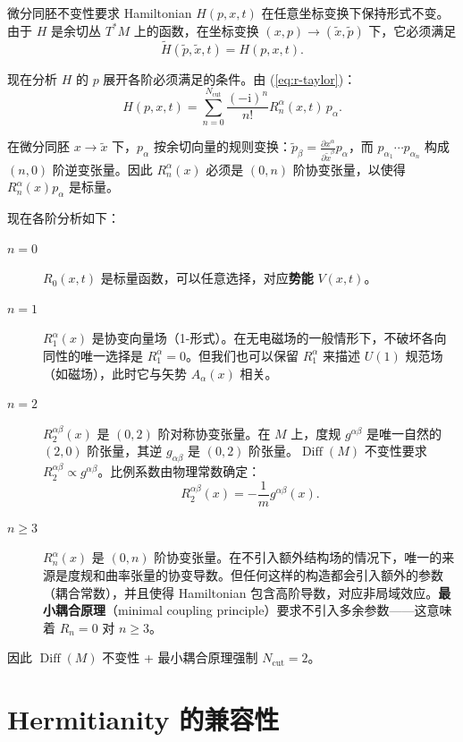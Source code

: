 \documentclass{book}
\newcommand{\mathi}{\mathrm{i}}
\begin{document}
微分同胚不变性要求 Hamiltonian $H(p,x,t)$ 在任意坐标变换下保持形式不变。由于 $H$ 是余切丛 $T^*M$ 上的函数，在坐标变换 $(x,p) \to (\tilde x, \tilde p)$ 下，它必须满足
\[
\tilde H(\tilde p, \tilde x, t) = H(p, x, t).
\]

现在分析 $H$ 的 $p$ 展开各阶必须满足的条件。由 (\ref{eq:r-taylor})：
\[
H(p,x,t) = \sum_{n=0}^{N_\text{cut}} \frac{(-\mathi)^n}{n!} R_n^\alpha(x,t) \, p_\alpha.
\]

在微分同胚 $x \to \tilde x$ 下，$p_\alpha$ 按余切向量的规则变换：$\tilde p_\beta = \frac{\partial x^\alpha}{\partial \tilde x^\beta} p_\alpha$，而 $p_{\alpha_1} \cdots p_{\alpha_n}$ 构成 $(n,0)$ 阶逆变张量。因此 $R_n^\alpha(x)$ 必须是 $(0,n)$ 阶协变张量，以使得 $R_n^\alpha(x) p_\alpha$ 是标量。

现在各阶分析如下：

\begin{description}
  \item[$n=0$] $R_0(x,t)$ 是标量函数，可以任意选择，对应\textbf{势能} $V(x,t)$。
  
  \item[$n=1$] $R_1^\alpha(x)$ 是协变向量场（1-形式）。在无电磁场的一般情形下，不破坏各向同性的唯一选择是 $R_1^\alpha = 0$。但我们也可以保留 $R_1^\alpha$ 来描述 $U(1)$ 规范场（如磁场），此时它与矢势 $A_\alpha(x)$ 相关。
  
  \item[$n=2$] $R_2^{\alpha\beta}(x)$ 是 $(0,2)$ 阶对称协变张量。在 $M$ 上，度规 $g^{\alpha\beta}$ 是唯一自然的 $(2,0)$ 阶张量，其逆 $g_{\alpha\beta}$ 是 $(0,2)$ 阶张量。$\operatorname{Diff}(M)$ 不变性要求 $R_2^{\alpha\beta} \propto g^{\alpha\beta}$。比例系数由物理常数确定：
    \[
    R_2^{\alpha\beta}(x) = -\frac{1}{m} g^{\alpha\beta}(x).
    \]
  
  \item[$n \ge 3$] $R_n^\alpha(x)$ 是 $(0,n)$ 阶协变张量。在不引入额外结构场的情况下，唯一的来源是度规和曲率张量的协变导数。但任何这样的构造都会引入额外的参数（耦合常数），并且使得 Hamiltonian 包含高阶导数，对应非局域效应。\textbf{最小耦合原理}（minimal coupling principle）要求不引入多余参数——这意味着 $R_n = 0$ 对 $n \ge 3$。
\end{description}

因此 $\operatorname{Diff}(M)$ 不变性 + 最小耦合原理强制 $N_\text{cut} = 2$。

\section{Hermitianity 的兼容性}
\end{document}

